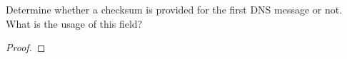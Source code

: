 \documentclass[../../main.tex]{subfiles}
\begin{document}
\begin{wts}
Determine whether a checksum is provided for the first DNS message or not. What is the usage of this field?
\end{wts}
\begin{proof}

\end{proof}
\end{document}
